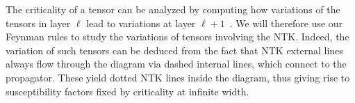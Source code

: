 The criticality of a tensor can be analyzed by computing how variations of the tensors in layer $\ell$ lead to variations at layer $\ell+1$~\cite{roberts2022, banta2024}.
We will therefore use our Feynman rules to study the variations of tensors involving the NTK. Indeed, the variation of such tensors can be deduced from the fact that NTK external lines always flow through the diagram via dashed internal lines, which connect to the propagator. These yield dotted NTK lines inside the diagram, thus giving rise to susceptibility factors fixed by criticality at infinite width.


